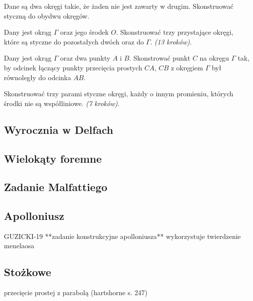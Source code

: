 \begin{problem}
    Dane są dwa okręgi takie, że żaden nie jest zawarty w drugim.
    Skonstruować styczną do obydwu okręgów.
\end{problem}

\begin{problem}
    Dany jest okrąg $\Gamma$ oraz jego środek $O$.
    Skonstruować trzy przystające okręgi, które są styczne do pozostałych dwóch oraz do $\Gamma$. \hfill \emph{(13 kroków)}. %
\end{problem}

\begin{problem}
    Dany jest okrąg $\Gamma$ oraz dwa punkty $A$ i $B$.
    Skonstrować punkt $C$ na okręgu $\Gamma$ tak, by odcinek łączący punkty przecięcia prostych $CA$, $CB$ z okręgiem $\Gamma$ był równoległy do odcinka $AB$.
\end{problem}

\begin{problem}
    Skonstruować trzy parami styczne okręgi, każdy o innym promieniu, których środki nie są współliniowe. \hfill \emph{(7 kroków)}. %
\end{problem}

\subsection{Wyrocznia w Delfach}


\subsection{Wielokąty foremne}


\subsection{Zadanie Malfattiego}


\subsection{Apolloniusz}
GUZICKI-19 **zadanie konstrukcyjne apolloniusza** wykorzystuje twierdzenie menelaosa



\subsection{Stożkowe}
przecięcie prostej z parabolą (hartshorne s. 247)

